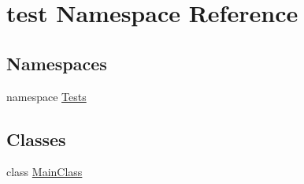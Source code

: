 \hypertarget{namespacetest}{}\section{test Namespace Reference}
\label{namespacetest}
\subsection*{Namespaces}
\begin{DoxyCompactItemize}
\item 
namespace \hyperlink{namespacetest_1_1Tests}{Tests}
\end{DoxyCompactItemize}
\subsection*{Classes}
\begin{DoxyCompactItemize}
\item 
class \hyperlink{classtest_1_1MainClass}{Main\+Class}
\end{DoxyCompactItemize}
